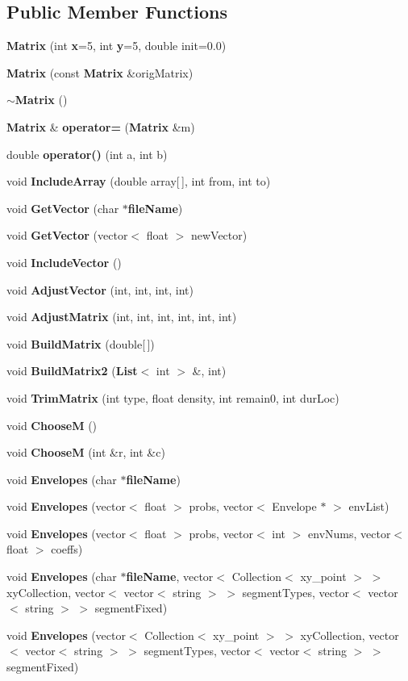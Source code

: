 \subsection*{Public Member Functions}
\begin{CompactItemize}
\item 
{\bf Matrix} (int {\bf x}=5, int {\bf y}=5, double init=0.0)
\item 
{\bf Matrix} (const  {\bf Matrix} \&orig\-Matrix)
\item 
{\bf $\sim$Matrix} ()
\item 
{\bf Matrix} \& {\bf operator=} ({\bf Matrix} \&m)
\item 
double {\bf operator()} (int a, int b)
\item 
void {\bf Include\-Array} (double array[$\,$], int from, int to)
\item 
void {\bf Get\-Vector} (char $\ast${\bf file\-Name})
\item 
void {\bf Get\-Vector} (vector$<$ float $>$ new\-Vector)
\item 
void {\bf Include\-Vector} ()
\item 
void {\bf Adjust\-Vector} (int, int, int, int)
\item 
void {\bf Adjust\-Matrix} (int, int, int, int, int, int)
\item 
void {\bf Build\-Matrix} (double[$\,$])
\item 
void {\bf Build\-Matrix2} ({\bf List}$<$ int $>$ \&, int)
\item 
void {\bf Trim\-Matrix} (int type, float density, int remain0, int dur\-Loc)
\item 
void {\bf Choose\-M} ()
\item 
void {\bf Choose\-M} (int \&r, int \&c)
\item 
void {\bf Envelopes} (char $\ast${\bf file\-Name})
\item 
void {\bf Envelopes} (vector$<$ float $>$ probs, vector$<$ Envelope $\ast$ $>$ env\-List)
\item 
void {\bf Envelopes} (vector$<$ float $>$ probs, vector$<$ int $>$ env\-Nums, vector$<$ float $>$ coeffs)
\item 
void {\bf Envelopes} (char $\ast${\bf file\-Name}, vector$<$ Collection$<$ xy\_\-point $>$ $>$ xy\-Collection, vector$<$ vector$<$ string $>$ $>$ segment\-Types, vector$<$ vector$<$ string $>$ $>$ segment\-Fixed)
\item 
void {\bf Envelopes} (vector$<$ Collection$<$ xy\_\-point $>$ $>$ xy\-Collection, vector$<$ vector$<$ string $>$ $>$ segment\-Types, vector$<$ vector$<$ string $>$ $>$ segment\-Fixed)

\end{CompactItemize}
